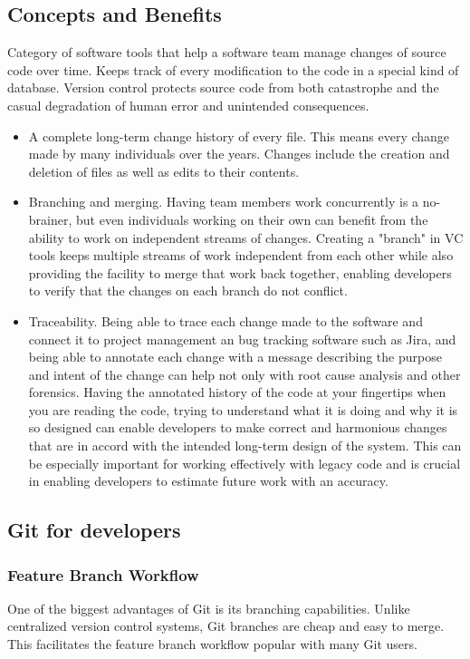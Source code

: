 \documentclass[11pt]{article}
\begin{document}
\subsection{Concepts and Benefits}
\label{sec-1-4}
Category of software tools that help a software team manage changes of source code over time. Keeps track of every modification to the code in a special kind of database. Version control protects source code from both catastrophe and the casual degradation of human error and unintended consequences.
\begin{itemize}
\item A complete long-term change history of every file. This means every change made by many individuals over the years. Changes include the creation and deletion of files as well as edits to their contents.
\item Branching and merging. Having team members work concurrently is a no-brainer, but even individuals working on their own can benefit from the ability to work on independent streams of changes. Creating a "branch" in VC tools keeps multiple streams of work independent from each other while also providing the facility to merge that work back together, enabling developers to verify that the changes on each branch do not conflict.
\item Traceability. Being able to trace each change made to the software and connect it to project management an bug tracking software such as Jira, and being able to annotate each change with a message describing the purpose and intent of the change can help not only with root cause analysis and other forensics. Having the annotated history of the code at your fingertips when you are reading the code, trying to understand what it is doing and why it is so designed can enable developers to make correct and harmonious changes that are in accord with the intended long-term design of the system. This can be especially important for working effectively with legacy code and is crucial in enabling developers to estimate future work with an accuracy.
\end{itemize}
\subsection{Git for developers}
\label{sec-1-5}
\subsubsection{Feature Branch Workflow}
\label{sec-1-5-1}
One of the biggest advantages of Git is its branching capabilities. Unlike centralized version control systems, Git branches are cheap and easy to merge. This facilitates the feature branch workflow popular with many Git users.
\end{document}
